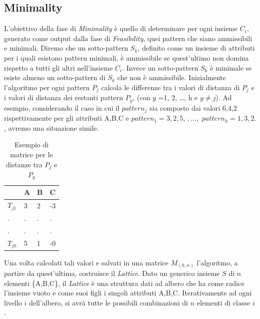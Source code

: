 \subsection{Minimality}
L'obiettivo della fase di \emph{Minimality} è quello di determinare per ogni insieme $C_i$, generato come output dalla fase di \emph{Feasibility}, quei pattern che siano ammissibili e minimali. Diremo che un sotto-pattern $S_k$, definito come un insieme di attributi per i quali esistono pattern minimali, è ammissibile se quest'ultimo non domina rispetto a tutti gli altri nell'insieme $C_i$. Invece un sotto-pattern $S_k$ è minimale se esiste almeno un sotto-pattern di $S_k$ che non è ammissibile. Inizialmente l'algoritmo per ogni pattern $P_j$ calcola le differenze tra i valori di distanza di $P_j$ e i valori di distanza dei restanti pattern $P_y$, (con $y$ =1, 2, \ldots, h e $y \neq j$).  Ad esempio, considerando il caso in cui il $pattern_j$ sia composto dai valori 6,4,2 rispettivamente per gli attributi A,B,C e $pattern_1 = 3,2,5$, $,...,$ $pattern_h = 1,3,2.$, avremo una situazione simile.
\begin{table}[H]
	\centering
	\begin{tabular}{ | l | l | l | l |}
		\hline
		& A & B & C \\
		\hline
		$T_{j1}$ & 3 & 2 & -3\\
		\hline
		. & . & . & .\\ 
		\hline
		. & . & . & . \\  
		\hline 
		$T_{jh}$ & 5 & 1 & -0\\ 
		\hline
	\end{tabular}
 \caption{Esempio di matrice per le distanze tra $P_j$ e $P_y$}
 \label{tab:table esempio}
\end{table}
Una volta calcolati tali valori e salvati in una matrice $M_{(h,n)}$ l'algoritmo, a partire da quest'ultima, costruisce il \emph{Lattice}. Dato un generico insieme $S$ di $n$ elementi \{A,B,C\}, il \emph{Lattice} è una struttura dati ad albero che ha come radice l'insieme vuoto e come suoi figli i singoli attributi A,B,C. Iterativamente ad ogni livello $i$ dell'albero, si avrà tutte le possibili combinazioni di $n$ elementi di classe $i$.\\
